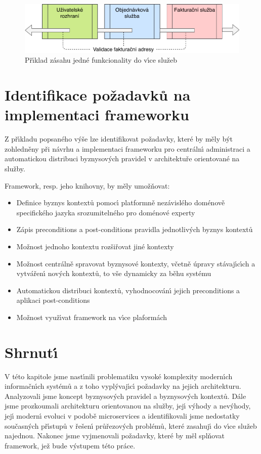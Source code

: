 \begin{figure}
    \centering
    \includegraphics[keepaspectratio=true, width=0.8\linewidth]{figures/service-cutting.pdf}
    \caption{Př\'{\i}klad zásahu jedné funkcionality do v\'{\i}ce služeb}
    \label{fig:service-cutting}
\end{figure}

\section{Identifikace požadavků na implementaci frameworku}\label{sec:implementation-requirements}

Z př\'{\i}kladu popsaného v\'yše lze identifikovat požadavky, které by měly
b\'yt zohledněny při návrhu a implementaci frameworku pro centráln\'{\i} administraci
a automatickou distribuci byznysov\'ych pravidel v architektuře orientované na služby.

Framework, resp. jeho knihovny, by měly umožňovat:

\begin{itemize}
    \item{Definice byznys kontextů pomoc\'{\i} platformně nezávislého doménově specifického jazyka srozumitelného pro doménové experty}
    \item{Zápis preconditions a post-conditions pravidla jednotliv\'ych byznys kontextů}
    \item{Možnost jednoho kontextu rozšiřovat jiné kontexty}
    \item{Možnost centrálně spravovat byznysové kontexty, včetně úpravy stávaj\'{\i}c\'{\i}ch a vytvářen\'{\i} nov\'ych kontextů, to vše dynamicky za běhu systému}
    \item{Automatickou distribuci kontextů, vyhodnocován\'{\i} jejich preconditions a aplikaci post-conditions}
    \item{Možnost využ\'{\i}vat framework na v\'{\i}ce plaformách}
\end{itemize}

\section{Shrnut\'{\i}}

V této kapitole jsme nast\'{\i}nili problematiku vysoké komplexity modern\'{\i}ch informačn\'{\i}ch systémů
a z toho vypl\'yvaj\'{\i}c\'{\i} požadavky na jejich architekturu. Analyzovali jsme koncept byznysov\'ych
pravidel a byznysov\'ych kontextů. Dále jsme prozkoumali architekturu orientovanou na služby, jej\'{\i}
v\'yhody a nev\'yhody, jej\'{\i} modern\'{\i} evoluci v podobě microservices a identifikovali jsme nedostatky
současn\'ych př\'{\i}stupů v řešen\'{\i} průřezov\'ych problémů, které zasahuj\'{\i} do v\'{\i}ce služeb najednou. Nakonec
jsme vyjmenovali požadavky, které by měl splňovat framework, jež bude v\'ystupem této práce.
